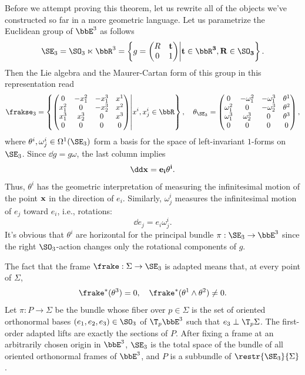 Before we attempt proving this theorem, let us rewrite all of the objects we've constructed so far in a more geometric language.
Let us parametrize the Euclidean group of $\bbE^3$ as follows 
\[\SE_3=\SO_3\ltimes\bbR^3=\left\{g=\begin{pmatrix}
    R & \bf{t}\\
    0 & 1
\end{pmatrix}\middle| \bf{t}\in\bbR^3,R\in\SO_3
\right\}.\]
Then the Lie algebra and the Maurer-Cartan form of this group in this representation read
\[ \frakse_3=\left\{\begin{pmatrix}
    0 & -x_1^2 & -x_1^3& x^1\\
    x_1^2 & 0 & -x_2^3 & x^2\\
    x_1^3 & x_2^3 & 0 & x^3\\
    0 & 0& 0& 0
\end{pmatrix}\middle| x^i,x^i_j\in\bbR\right\},
\quad
\theta_{\SE_3}=
    \begin{pmatrix}
        0 & -\omega_1^2 & -\omega_1^3& \theta^1\\
        \omega_1^2 & 0 & -\omega_2^3 & \theta^2\\
        \omega_1^3 & \omega_2^3 & 0 & \theta^3\\
        0 & 0& 0& 0
    \end{pmatrix},
\]
where $\theta^i,\omega^i_j\in\Omega^1(\SE_3)$ form a basis for the space of left-invariant $1$-forms on $\SE_3$. Since $\dd g=g\omega$, the last column implies 
\[\dd \bf{x}=e_i\theta^i.\]
Thus, $\theta^i$ has the geometric interpretation of measuring the infinitesimal motion of the point $\bf{x}$ in the direction of $e_i$. Similarly, $\omega^i_j$ measures the infinitesimal motion of $e_j$ toward $e_i$, i.e., rotations:
\[\dd e_j=e_i\omega^i_j.\label{eq def of omegas}\]
It's obvious that $\theta^i$ are horizontal for the principal bundle $\pi:\SE_3\to\bbE^3$ since the right $\SO_3$-action changes only the rotational components of $g$.

The fact that the frame $\frake:\Sigma\to \SE_3$ is adapted means that, at every point of $\Sigma$,
\[\frake^\ast(\theta^3)=0,\quad \frake^\ast(\theta^1\wedge\theta^2)\neq 0.\label{eq 2.2 Ivey}\]
Let $\pi:P\to \Sigma$ be the bundle whose fiber over $p\in\Sigma$ is the set of oriented orthonormal bases $(e_1,e_2,e_3)\in\SO_3$ of $\T_p \bbE^3$ such that $e_3\perp \T_p\Sigma$. The first-order adapted lifts are exactly the sections of $P$. After fixing a frame at an arbitrarily chosen origin in $\bbE^3$, $\SE_3$ is the total space of the bundle of all oriented orthonormal frames of $\bbE^3$, and $P$ is a subbundle of $\restr{\SE_3}{\Sigma}$.

